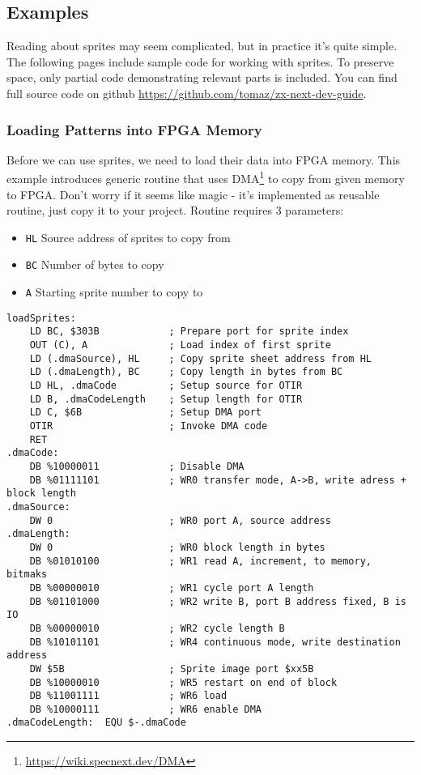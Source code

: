 \documentclass[12pt,twoside,openright,a4paper]{book}
\begin{document}
\subsection{Examples}

Reading about sprites may seem complicated, but in practice it's quite simple. The following pages include sample code for working with sprites. To preserve space, only partial code demonstrating relevant parts is included. You can find full source code on github \url{https://github.com/tomaz/zx-next-dev-guide}.


\pagebreak
\subsubsection{Loading Patterns into FPGA Memory}

Before we can use sprites, we need to load their data into FPGA memory. This example introduces generic routine that uses DMA\footnote{\url{https://wiki.specnext.dev/DMA}} to copy from given memory to FPGA. Don't worry if it seems like magic - it's implemented as reusable routine, just copy it to your project. Routine requires 3 parameters:

\begin{itemize}[topsep=1pt,itemsep=1pt]
	\item {\tt HL} Source address of sprites to copy from
	\item {\tt BC} Number of bytes to copy
	\item {\tt A} Starting sprite number to copy to
\end{itemize}

\begin{lstlisting}
loadSprites:
	LD BC, $303B            ; Prepare port for sprite index
	OUT (C), A              ; Load index of first sprite
	LD (.dmaSource), HL     ; Copy sprite sheet address from HL
	LD (.dmaLength), BC     ; Copy length in bytes from BC
	LD HL, .dmaCode         ; Setup source for OTIR
	LD B, .dmaCodeLength    ; Setup length for OTIR
	LD C, $6B               ; Setup DMA port
	OTIR                    ; Invoke DMA code
	RET
.dmaCode:
	DB %10000011            ; Disable DMA
	DB %01111101            ; WR0 transfer mode, A->B, write adress + block length
.dmaSource:
	DW 0                    ; WR0 port A, source address
.dmaLength:
	DW 0                    ; WR0 block length in bytes
	DB %01010100            ; WR1 read A, increment, to memory, bitmaks
	DB %00000010            ; WR1 cycle port A length
	DB %01101000            ; WR2 write B, port B address fixed, B is IO
	DB %00000010            ; WR2 cycle length B
	DB %10101101            ; WR4 continuous mode, write destination address
	DW $5B                  ; Sprite image port $xx5B
	DB %10000010            ; WR5 restart on end of block
	DB %11001111            ; WR6 load
	DB %10000111            ; WR6 enable DMA
.dmaCodeLength:  EQU $-.dmaCode
\end{lstlisting}
\end{document}
